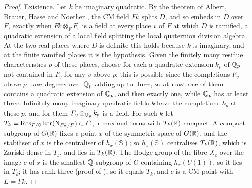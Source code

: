 \begin{proof}
Existence. Let $k$ be imaginary quadratic. By the theorem of Albert, Brauer,
Hasse and Noether \cite[\S1.5]{PR94}, the CM field $Fk$ splits $D$, and so
embeds in $D$ over $F$, exactly when $Fk\otimes_{F}F_{v}$ is a field at
every place $v$ of $F$ at which $D$ is ramified, a quadratic extension of a
local field splitting the local quaternion division algebra. At the two real
places where $D$ is definite this holds because $k$ is imaginary, and at the
finite ramified places it is the hypothesis. Given the finitely many
residue characteristics $p$ of these places, choose for each a quadratic
extension $k_{p}$ of $\mathbb{Q}_{p}$ not contained in $F_{v}$ for any $v$ above
$p$: this is possible since the completions $F_{v}$ above $p$ have degrees
over $\mathbb{Q}_{p}$ adding up to three, so at most one of them contains a
quadratic extension of $\mathbb{Q}_{p}$, and then exactly one, while $\mathbb{Q}_{p}$ has
at least three. Infinitely many imaginary quadratic fields $k$ have the
completions $k_{p}$ at these $p$, and for them
$F_{v}\otimes_{\mathbb{Q}_{p}}k_{p}$ is a field. For such $k$ let
$T_{k}=\operatorname{Res}_{F/\mathbb{Q}}\ker(\mathrm{N}_{Fk/F})\subset G$, a maximal torus with
$T_{k}(\mathbb{R})$ compact. A compact subgroup of $G(\mathbb{R})$ fixes a point $x$ of the
symmetric space of $G(\mathbb{R})$, and the stabiliser of $x$ is the centraliser of
$h_{x}(\mathbb{S})$; so $h_{x}(\mathbb{S})$ centralises $T_{k}(\mathbb{R})$, which
is Zariski dense in $T_{k}$, and lies in $T_{k}(\mathbb{R})$. The Hodge group of
the fibre $X_{c}$ over the image $c$ of $x$ is the smallest $\mathbb{Q}$-subgroup
of $G$ containing $h_{x}(U(1))$, so it lies in $T_{k}$; it has rank three
(proof of ), so it equals $T_{k}$, and $c$ is a CM
point with $L=Fk$.
\end{proof}

